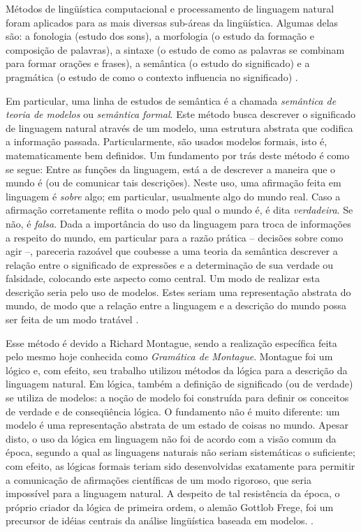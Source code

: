 	Métodos de lingüística computacional e processamento de linguagem natural foram aplicados para as mais diversas sub-áreas da lingüística. Algumas delas são: a fonologia (estudo dos sons), a morfologia (o estudo da formação e composição de palavras), a sintaxe (o estudo de como as palavras se combinam para formar orações e frases), a semântica (o estudo do significado) e a pragmática (o estudo de como o contexto influencia no significado) \citep[p.~2]{vanEijck:2010}.
	
	Em particular, uma linha de estudos de semântica é a chamada \textit{semântica de teoria de modelos} ou \textit{semântica formal}. Este método busca descrever o significado de linguagem natural através de um modelo, uma estrutura abstrata que codifica a informação passada. Particularmente, são usados modelos formais, isto é, matematicamente bem definidos. Um fundamento por trás deste método é como se segue:
		Entre as funções da linguagem, está a de descrever a maneira que o mundo é (ou de comunicar tais descrições). Neste uso, uma afirmação feita em linguagem é \textit{sobre} algo; em particular, usualmente algo do mundo real. Caso a afirmação corretamente reflita o modo pelo qual o mundo é, é dita \textit{verdadeira}. Se não, é \textit{falsa}. Dada a importância do uso da linguagem para troca de informações a respeito do mundo, em particular para a razão prática -- decisões sobre como agir --, pareceria razoável que coubesse a uma teoria da semântica descrever a relação entre o significado de expressões e a determinação de sua verdade ou falsidade, colocando este aspecto como central.
%		
		Um modo de realizar esta descrição seria pelo uso de modelos. Estes seriam uma representação abstrata do mundo, de modo que a relação entre a linguagem e a descrição do mundo possa ser feita de um modo tratável \citep[pp.~11--13]{Kamp:1993}.
	
	Esse método é devido a Richard Montague, sendo a realização específica feita pelo mesmo hoje conhecida como \textit{Gramática de Montague}. 
	Montague foi um lógico e, com efeito, seu trabalho utilizou métodos da lógica para a descrição da linguagem natural. Em lógica, também a definição de significado (ou de verdade) se utiliza de modelos: a noção de modelo foi construída para definir os conceitos de verdade e de conseqüência lógica. O fundamento não é muito diferente: um modelo é uma representação abstrata de um estado de coisas no mundo. Apesar disto, o uso da lógica em linguagem não foi de acordo com a visão comum da época, segundo a qual as linguagens naturais não seriam sistemáticas o suficiente; com efeito, as lógicas formais teriam sido desenvolvidas exatamente para permitir a comunicação de afirmações científicas de um modo rigoroso, que seria impossível para a linguagem natural. A despeito de tal resistência da época,  o próprio criador da lógica de primeira ordem, o alemão Gottlob Frege, foi um precursor de idéias centrais da análise lingüística baseada em modelos. \citep[pp.~12,16--17,21--23]{Kamp:1993}. 

